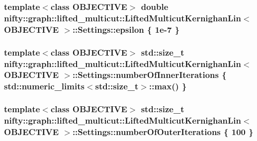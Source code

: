 \subsubsection[{epsilon}]{\setlength{\rightskip}{0pt plus 5cm}template$<$class O\+B\+J\+E\+C\+T\+I\+V\+E$>$ double {\bf nifty\+::graph\+::lifted\+\_\+multicut\+::\+Lifted\+Multicut\+Kernighan\+Lin}$<$ O\+B\+J\+E\+C\+T\+I\+V\+E $>$\+::Settings\+::epsilon \{ 1e-\/7 \}}\label{structnifty_1_1graph_1_1lifted__multicut_1_1LiftedMulticutKernighanLin_1_1Settings_a817c535759f8338e7a3c01d99a42ba07}
\hypertarget{structnifty_1_1graph_1_1lifted__multicut_1_1LiftedMulticutKernighanLin_1_1Settings_a9b5f462a1c894c0f77ccdeff5a757241}{}
\subsubsection[{number\+Of\+Inner\+Iterations}]{\setlength{\rightskip}{0pt plus 5cm}template$<$class O\+B\+J\+E\+C\+T\+I\+V\+E$>$ std\+::size\+\_\+t {\bf nifty\+::graph\+::lifted\+\_\+multicut\+::\+Lifted\+Multicut\+Kernighan\+Lin}$<$ O\+B\+J\+E\+C\+T\+I\+V\+E $>$\+::Settings\+::number\+Of\+Inner\+Iterations \{ std\+::numeric\+\_\+limits$<$std\+::size\+\_\+t$>$\+::max() \}}\label{structnifty_1_1graph_1_1lifted__multicut_1_1LiftedMulticutKernighanLin_1_1Settings_a9b5f462a1c894c0f77ccdeff5a757241}
\hypertarget{structnifty_1_1graph_1_1lifted__multicut_1_1LiftedMulticutKernighanLin_1_1Settings_a30a6000358086c39d4b403f3ea7aef76}{}
\subsubsection[{number\+Of\+Outer\+Iterations}]{\setlength{\rightskip}{0pt plus 5cm}template$<$class O\+B\+J\+E\+C\+T\+I\+V\+E$>$ std\+::size\+\_\+t {\bf nifty\+::graph\+::lifted\+\_\+multicut\+::\+Lifted\+Multicut\+Kernighan\+Lin}$<$ O\+B\+J\+E\+C\+T\+I\+V\+E $>$\+::Settings\+::number\+Of\+Outer\+Iterations \{ 100 \}}\label{structnifty_1_1graph_1_1lifted__multicut_1_1LiftedMulticutKernighanLin_1_1Settings_a30a6000358086c39d4b403f3ea7aef76}


